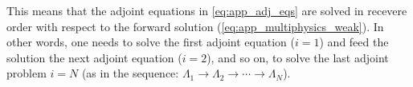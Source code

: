 This means that the adjoint equations in \eqref{eq:app_adj_eqs} are solved in recevere order with respect to the forward solution (\eqref{eq:app_multiphysics_weak}). In other words, one needs to solve the first adjoint equation ($i=1$) 
and feed the solution the next adjoint equation ($i=2$), and so on, to solve the last adjoint problem $i=N$  (as in the sequence: $\Lambda_1 \to \Lambda_{2} \to \cdots \to \Lambda_N$).




